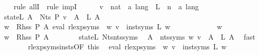 \begin{isabellebody}
\ \ \isamarkupfalse%
\ {\isacharparenleft}{\kern0pt}rule\ allI\ {\isacharbar}{\kern0pt}\ rule\ impI{\isacharparenright}{\kern0pt}{\isacharplus}{\kern0pt}\isanewline
\ \ \ \ \isamarkupfalse%
\ v\ {\isacharcolon}{\kern0pt}{\isacharcolon}{\kern0pt}\ {\isachardoublequoteopen}nat\ {\isasymRightarrow}\ {\isacharprime}{\kern0pt}a\ lang{\isachardoublequoteclose}\ \ L\ {\isacharcolon}{\kern0pt}{\isacharcolon}{\kern0pt}\ {\isachardoublequoteopen}{\isacharprime}{\kern0pt}n\ {\isasymRightarrow}\ {\isacharprime}{\kern0pt}a\ lang{\isachardoublequoteclose}\isanewline
\ \ \ \ \isamarkupfalse%
\ state{\isacharunderscore}{\kern0pt}L{\isacharcolon}{\kern0pt}\ {\isachardoublequoteopen}{\isasymforall}A\ {\isasymin}\ Nts\ P{\isachardot}{\kern0pt}\ v\ {\isacharparenleft}{\kern0pt}{\isasymgamma}{\isacharprime}{\kern0pt}\ A{\isacharparenright}{\kern0pt}\ {\isacharequal}{\kern0pt}\ L\ A{\isachardoublequoteclose}\isanewline
\isanewline
\ \ \ \ \isamarkupfalse%
\ {\isachardoublequoteopen}{\isasymforall}w\ {\isasymin}\ Rhss\ P\ A{\isachardot}{\kern0pt}\ eval\ {\isacharparenleft}{\kern0pt}rlexp{\isacharunderscore}{\kern0pt}syms\ {\isasymgamma}{\isacharprime}{\kern0pt}\ w{\isacharparenright}{\kern0pt}\ v\ {\isacharequal}{\kern0pt}\ inst{\isacharunderscore}{\kern0pt}syms\ L\ w{\isachardoublequoteclose}\isanewline
\ \ \ \ \isamarkupfalse%
\isanewline
\ \ \ \ \ \ \isamarkupfalse%
\ w\isanewline
\ \ \ \ \ \ \isamarkupfalse%
\ {\isachardoublequoteopen}w\ {\isasymin}\ Rhss\ P\ A{\isachardoublequoteclose}\isanewline
\ \ \ \ \ \ \isamarkupfalse%
\ state{\isacharunderscore}{\kern0pt}L\ Nts{\isacharunderscore}{\kern0pt}nts{\isacharunderscore}{\kern0pt}syms\ \isamarkupfalse%
\ {\isachardoublequoteopen}{\isasymforall}A\ {\isasymin}\ nts{\isacharunderscore}{\kern0pt}syms\ w{\isachardot}{\kern0pt}\ v\ {\isacharparenleft}{\kern0pt}{\isasymgamma}{\isacharprime}{\kern0pt}\ A{\isacharparenright}{\kern0pt}\ {\isacharequal}{\kern0pt}\ L\ A{\isachardoublequoteclose}\ \isamarkupfalse%
\ fast\isanewline
\ \ \ \ \ \ \isamarkupfalse%
\ rlexp{\isacharunderscore}{\kern0pt}syms{\isacharunderscore}{\kern0pt}insts{\isacharbrackleft}{\kern0pt}OF\ this{\isacharbrackright}{\kern0pt}\ \isamarkupfalse%
\ {\isachardoublequoteopen}eval\ {\isacharparenleft}{\kern0pt}rlexp{\isacharunderscore}{\kern0pt}syms\ {\isasymgamma}{\isacharprime}{\kern0pt}\ w{\isacharparenright}{\kern0pt}\ v\ {\isacharequal}{\kern0pt}\ inst{\isacharunderscore}{\kern0pt}syms\ L\ w{\isachardoublequoteclose}\ \isamarkupfalse%

\end{isabellebody}
